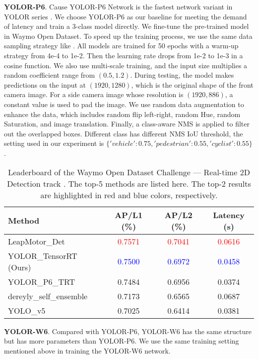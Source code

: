 \documentclass[final]{cvpr}
\begin{document}
\noindent\textbf{YOLOR-P6}.  Cause YOLOR-P6 Network is the fastest network variant in YOLOR series \cite{wang2021you}. We choose YOLOR-P6 as our baseline for meeting the demand of latency and train a 3-class model directly. We fine-tune the pre-trained model in Waymo Open Dataset. To speed up the training process, we use the same data sampling strategy like \cite{chen20202nd}. All models are trained for 50 epochs with a warm-up strategy from 4e-4 to 1e-2. Then the learning rate drops from 1e-2 to 1e-3 in a cosine function. We also use multi-scale training, and the input size multiplies a random coefficient range from $(0.5, 1.2)$. During testing, the model makes predictions on the input at $(1920, 1280)$, which is the original shape of the front camera image. For a side camera image whose resolution is $(1920, 886)$, a constant value is used to pad the image. We use random data augmentation to enhance the data, which includes random flip left-right, random Hue, random Saturation, and image translation. Finally, a class-aware NMS is applied to filter out the overlapped boxes. Different class has different NMS IoU threshold, the setting used in our experiment is $\{'vehicle':0.75, 'pedestrian':0.55, 'cyclist':0.55\}$.

\begin{table*}[!ht]
\begin{center}
\caption{Leaderboard of the Waymo Open Dataset Challenge --- Real-time 2D Detection track \cite{waymowebsite}. The top-5 methods are listed here. The top-2 results are highlighted in red and blue colors, respectively.}
\begin{tabular}{l|c|c|c}
\hline
Method & AP/L1 (\%) & AP/L2 (\%) &Latency (s)\\
\hline
LeapMotor\_Det & \textcolor{red}{0.7571} & \textcolor{red}{0.7041} & \textcolor{red}{0.0616} \\
YOLOR\_TensorRT (Ours) & \textcolor{blue}{0.7500} & \textcolor{blue}{0.6972} & \textcolor{blue}{0.0458} \\
YOLOR\_P6\_TRT & 0.7484 & 0.6956 & 0.0374\\
dereyly\_self\_ensemble & 0.7173 & 0.6565 & 0.0687 \\
YOLO\_v5 & 0.7025 & 0.6414 & 0.0381 \\
\hline
\end{tabular}
\label{tab:leaderboard}
\end{center}
\end{table*}

\noindent\textbf{YOLOR-W6}. Compared with YOLOR-P6, YOLOR-W6 has the same structure but has more parameters than YOLOR-P6. We use the same training setting mentioned above in training the YOLOR-W6 network.
\end{document}
